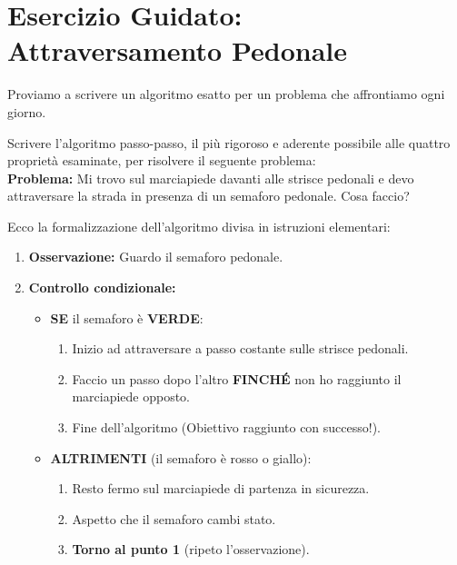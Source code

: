 \newpage
\section{Esercizio Guidato: Attraversamento Pedonale}

Proviamo a scrivere un algoritmo esatto per un problema che affrontiamo ogni giorno.

\begin{esercizio}
Scrivere l'algoritmo passo-passo, il più rigoroso e aderente possibile alle quattro proprietà esaminate, per risolvere il seguente problema:\\
\textbf{Problema:} Mi trovo sul marciapiede davanti alle strisce pedonali e devo attraversare la strada in presenza di un semaforo pedonale. Cosa faccio?
\end{esercizio}

\begin{soluzione}
Ecco la formalizzazione dell'algoritmo divisa in istruzioni elementari:

\begin{enumerate}
  \item \textbf{Osservazione:} Guardo il semaforo pedonale.
  \item \textbf{Controllo condizionale:}
  \begin{itemize}
    \item \textbf{SE} il semaforo è \textbf{VERDE}:
    \begin{enumerate}
      \item Inizio ad attraversare a passo costante sulle strisce pedonali.
      \item Faccio un passo dopo l'altro \textbf{FINCHÉ} non ho raggiunto il marciapiede opposto.
      \item Fine dell'algoritmo (Obiettivo raggiunto con successo!).
    \end{enumerate}
    \item \textbf{ALTRIMENTI} (il semaforo è rosso o giallo):
    \begin{enumerate}
      \item Resto fermo sul marciapiede di partenza in sicurezza.
      \item Aspetto che il semaforo cambi stato.
      \item \textbf{Torno al punto 1} (ripeto l'osservazione).
    \end{enumerate}
  \end{itemize}
\end{enumerate}
\end{soluzione}


